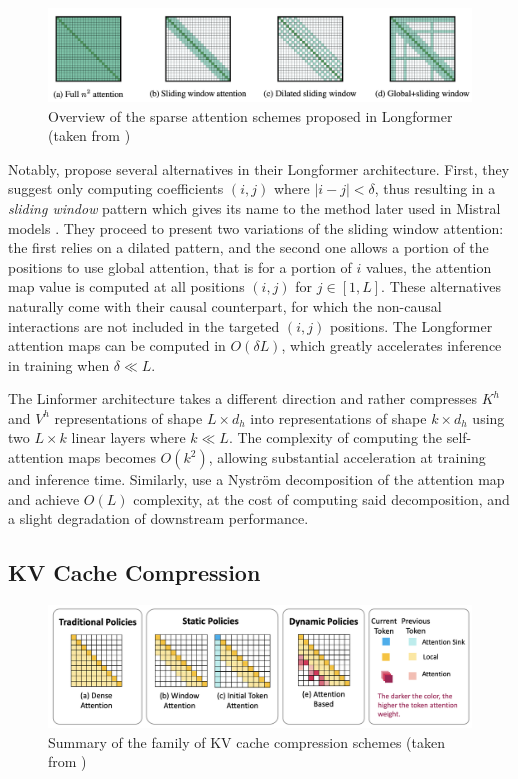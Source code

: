 \begin{figure}[ht]
    \centering
    \includegraphics[width=0.8\linewidth]{sources/related_works/imgs/longformer.png}
    \caption{Overview of the sparse attention schemes proposed in Longformer (taken from \citet{beltagy2020longformer})}
    \label{fig:longformer}
\end{figure}


Notably, \citet{beltagy2020longformer} propose several alternatives in their Longformer architecture. First, they suggest only computing coefficients $(i, j)$ where $|i - j| < \delta$, thus resulting in a \textit{sliding window} pattern which gives its name to the method later used in Mistral models \citep{jiang2023mistral}. They proceed to present two variations of the sliding window attention: the first relies on a dilated pattern, and the second one allows a portion of the positions to use global attention, that is for a portion of $i$ values, the attention map value is computed at all positions $(i, j)$ for $j \in [1, L]$. These alternatives naturally come with their causal counterpart, for which the non-causal interactions are not included in the targeted  $(i, j)$ positions. The Longformer attention maps can be computed in $O(\delta L)$, which greatly accelerates inference in training when $\delta \ll L$.

The Linformer architecture \citep{wang2020linformer} takes a different direction and rather compresses $K^h$ and $V^h$ representations of shape $L \times d_h$ into representations of shape $k \times d_h$ using two $L \times k$ linear layers where $k \ll L$. The complexity of computing the self-attention maps becomes $O(k^2)$, allowing substantial acceleration at training and inference time. Similarly, \citet{nystromformer} use a Nyström decomposition of the attention map and achieve $O(L)$ complexity, at the cost of computing said decomposition, and a slight degradation of downstream performance.

\subsection{KV Cache Compression}

\begin{figure}[ht]
    \centering
    \includegraphics[width=0.8\linewidth]{sources/related_works/imgs/kv_cache_comp.png}
    \caption{Summary of the family of KV cache compression schemes (taken from \citet{shi2024costdownreviewmethods})}
    \label{fig:kv_cache_comp}
\end{figure}

